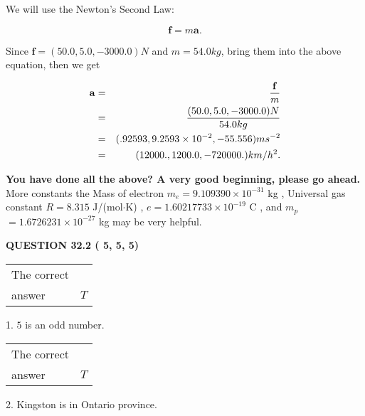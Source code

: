 \documentclass[12pt]{article}
\begin{document}
 
 
 
 
\noindent{}

We will use the Newton's Second Law:
 
\[
\mathbf{f}=m\mathbf{a}.
\]
 
Since $\mathbf{f}=( %
50.0,  %
5.0,  %
-3000.0 )N$
and $m= %
54.0 kg$, bring them into the above equation, then we get
 
\begin{eqnarray*}
\mathbf{a}&=&\frac{\mathbf{f}}m  \\
&=&\frac{(
50.0 ,
5.0 ,
-3000.0 )N
}{ %
54.0 kg}  \\
&=&(
.92593 ,
9.2593 \times 10^{-2},
-55.556
)ms^{-2} \\
&=&(
12000. ,
1200.0 ,
-720000.
)km/h^2.
\end{eqnarray*}
 
 
 
   
   
\vspace{0.3in}
{\textbf{\LARGE{You have done all the above? A very good beginning, please go ahead.}}}
More constants the
Mass of electron
$m_e$$ =
9.109390 \times 10^{-31} $
kg
,
Universal gas constant
$R$$ =
8.315 $
J/(mol$\cdot $K)
,
$e$$ =
1.60217733 \times 10^{-19} $
C
, and
$m_p$$ =
1.6726231 \times 10^{-27} $
kg
%
may be very helpful.
\vspace{0.3in}
   
   
  
\vspace{0.2in}
  
{\textbf{\Large{QUESTION
32.2 
 (          5,          5,          5)
}}}
  
  
 
 
\noindent{}

 
\noindent\begin{tabular}{|l|l|}\hline The correct & \\
          answer &  %
$T$ \\ \hline \end{tabular}
1. $ %
5$ is an  %
odd number.
 
\noindent\begin{tabular}{|l|l|}\hline The correct & \\
          answer &  %
$T$ \\ \hline \end{tabular}
2.  %
Kingston is in  %
Ontario province.
 
\end{document}
